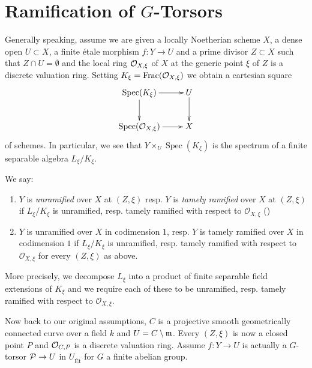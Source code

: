 \section{\texorpdfstring{Ramification of $G$-Torsors}{Ramification of G-Torsors}}\label{section:ramification_of_torsors}

Generally speaking, assume we are given a locally Noetherian scheme $X$,
a dense open $U \subset X$, a finite \'etale morphism $f: Y \to U$ and a prime divisor $Z \subset X$ such that $Z \cap U = \emptyset$
and the local ring $\mathcal{O}_{X, \xi}$ of $X$ at the generic point $\xi$ of $Z$ is a discrete valuation ring.
Setting $K_\xi = \operatorname{Frac}(\mathcal{O}_{X, \xi})$ we obtain a cartesian square
\[ \xymatrix{ \mathop{\mathrm{Spec}}(K_\xi ) \ar[r] \ar[d] & U \ar[d] \\ \mathop{\mathrm{Spec}}(\mathcal{O}_{X, \xi }) \ar[r] & X } \]
of schemes.
In particular, we see that $Y \times _ U \mathop{\mathrm{Spec}}(K_\xi )$ is the spectrum of a finite separable algebra $L_\xi /K_\xi $.
\begin{definition}\label{definition:tamely_ramified_in_codim_1}
We say:
\begin{enumerate}
    \item $Y$ is \textit{unramified} over $X$ at $(Z, \xi)$ resp. $Y$ is \textit{tamely ramified} over $X$ at $(Z, \xi)$
        if $L_\xi /K_\xi $ is unramified, resp. tamely ramified with respect to $\mathcal{O}_{X, \xi }$
        ()

    \item $Y$ is unramified over $X$ in codimension $1$, resp. $Y$ is tamely ramified over $X$ in codimension $1$ if $L_\xi /K_\xi $ is unramified, resp. tamely ramified
    with respect to $\mathcal{O}_{X, \xi }$ for every $(Z, \xi )$ as above.
\end{enumerate}

More precisely, we decompose $L_\xi $ into a product of finite separable field extensions of $K_\xi $ and we require each of these to be unramified, resp. tamely ramified with
respect to $\mathcal{O}_{X, \xi }$.

\end{definition}

Now back to our original assumptions, $C$ is a projective smooth geometrically connected curve
over a field $k$ and $U=C\setminus \mathfrak{m}$. Every $(Z, \xi)$ is now a closed point $P$ and $\mathcal{O}_{C, P}$ is a discrete valuation ring.
Assume $f: Y \to U$ is actually a $G$-torsor $\mathcal{P} \to U$ in $U_{\text{\'Et}}$ for $G$ a finite abelian group.

